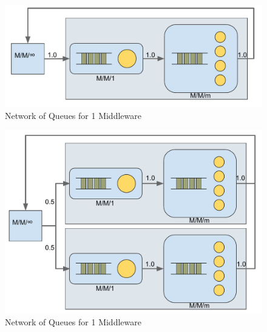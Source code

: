 \documentclass[11pt,a4paper]{article}
\begin{document}
\begin{figure}
    \includegraphics[width=.7\linewidth]{plots/NetworkOfQueues1MW.pdf}
    \caption{Network of Queues for 1 Middleware}
    \label{fig:7-3:1MW}
\end{figure}

\begin{figure}
    \includegraphics[width=.7\linewidth]{plots/NetworkOfQueues2MW.pdf}
    \caption{Network of Queues for 1 Middleware}
    \label{fig:7-3:2MW}
\end{figure}
\end{document}
